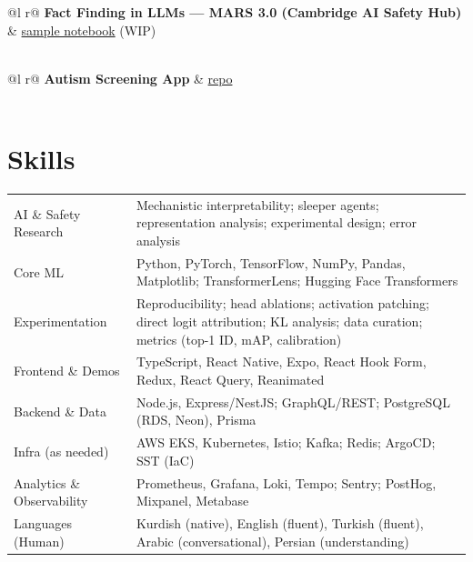 \documentclass[a4paper,12pt]{article}
\begin{document}
\vspace{6pt}

\begin{tabularx}{\linewidth}{ @{}l r@{} }
\textbf{Fact Finding in LLMs — MARS 3.0 (Cambridge AI Safety Hub)} & \hfill \href{https://stefanhex.com/mars-transformer-knowledge/ablations_main.html}{sample notebook} (WIP) \\[3.75pt]
  \\
\end{tabularx}

\vspace{6pt}

\begin{tabularx}{\linewidth}{ @{}l r@{} }
\textbf{Autism Screening App} & \hfill \href{https://github.com/mshahoyi/asd_screener}{repo} \\[3.75pt]
  \\
\end{tabularx}

\section{Skills}
\begin{tabularx}{\linewidth}{@{}l X@{}}
AI \& Safety Research & Mechanistic interpretability; sleeper agents; representation analysis; experimental design; error analysis \\
Core ML & Python, PyTorch, TensorFlow, NumPy, Pandas, Matplotlib; TransformerLens; Hugging Face Transformers \\
Experimentation & Reproducibility; head ablations; activation patching; direct logit attribution; KL analysis; data curation; metrics (top-1 ID, mAP, calibration) \\
Frontend \& Demos & TypeScript, React Native, Expo, React Hook Form, Redux, React Query, Reanimated \\
Backend \& Data & Node.js, Express/NestJS; GraphQL/REST; PostgreSQL (RDS, Neon), Prisma \\
Infra (as needed) & AWS EKS, Kubernetes, Istio; Kafka; Redis; ArgoCD; SST (IaC) \\
Analytics \& Observability & Prometheus, Grafana, Loki, Tempo; Sentry; PostHog, Mixpanel, Metabase \\
Languages (Human) & Kurdish (native), English (fluent), Turkish (fluent), Arabic (conversational), Persian (understanding) \\
\end{tabularx}

\vfill
{}
\end{document}
